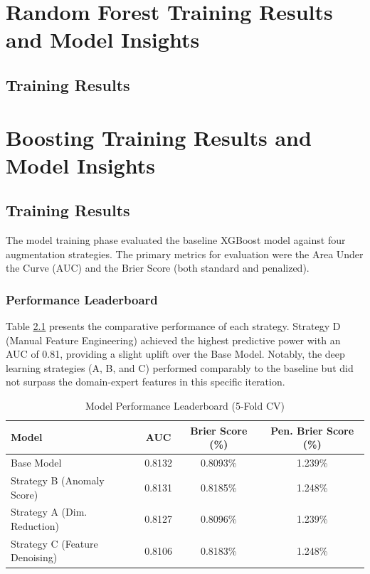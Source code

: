 \documentclass{report}\usepackage[]{graphicx}\usepackage[]{xcolor}
\begin{document}

\chapter{Random Forest Training Results and Model Insights}

\section{Training Results}


\chapter{Boosting Training Results and Model Insights}

\section{Training Results}

The model training phase evaluated the baseline XGBoost model against four augmentation strategies. The primary metrics for evaluation were the Area Under the Curve (AUC) and the Brier Score (both standard and penalized).

\subsection{Performance Leaderboard}

Table \ref{tab:leaderboard} presents the comparative performance of each strategy. Strategy D (Manual Feature Engineering) achieved the highest predictive power with an AUC of 0.81, providing a slight uplift over the Base Model. Notably, the deep learning strategies (A, B, and C) performed comparably to the baseline but did not surpass the domain-expert features in this specific iteration.

\begin{table}[h]
    \centering
    \caption{Model Performance Leaderboard (5-Fold CV)}
    \label{tab:leaderboard}
    \begin{tabular}{lccc}
        \hline
        \textbf{Model} & \textbf{AUC} & \textbf{Brier Score (\%)} & \textbf{Pen. Brier Score (\%)} \\
        \hline
        Base Model & 0.8132 & 0.8093\% & 1.239\% \\
        Strategy B (Anomaly Score) & 0.8131 & 0.8185\% & 1.248\% \\
        Strategy A (Dim. Reduction) & 0.8127 & 0.8096\% & 1.239\% \\
        Strategy C (Feature Denoising) & 0.8106 & 0.8183\% & 1.248\% \\
        \hline
    \end{tabular}
\end{table}
\end{document}
